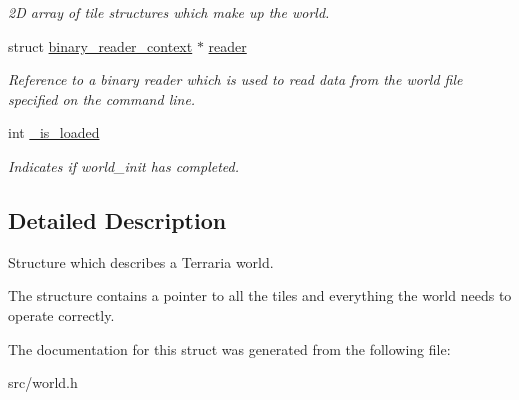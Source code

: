 \begin{DoxyCompactItemize}
\begin{DoxyCompactList}\small\item\em 2\+D array of tile structures which make up the world. \end{DoxyCompactList}\item 
\hypertarget{structworld_afc77883907d7f0ad7c91dd2b230768a5}{}struct \hyperlink{structbinary__reader__context}{binary\+\_\+reader\+\_\+context} $\ast$ \hyperlink{structworld_afc77883907d7f0ad7c91dd2b230768a5}{reader}\label{structworld_afc77883907d7f0ad7c91dd2b230768a5}

\begin{DoxyCompactList}\small\item\em Reference to a binary reader which is used to read data from the world file specified on the command line. \end{DoxyCompactList}\item 
\hypertarget{structworld_ac18320e424b3a007a74c03ea00a55c56}{}int \hyperlink{structworld_ac18320e424b3a007a74c03ea00a55c56}{\+\_\+is\+\_\+loaded}\label{structworld_ac18320e424b3a007a74c03ea00a55c56}

\begin{DoxyCompactList}\small\item\em Indicates if world\+\_\+init has completed. \end{DoxyCompactList}\end{DoxyCompactItemize}


\subsection{Detailed Description}
Structure which describes a Terraria world. 

The structure contains a pointer to all the tiles and everything the world needs to operate correctly. 

The documentation for this struct was generated from the following file\+:\begin{DoxyCompactItemize}
\item 
src/world.\+h\end{DoxyCompactItemize}
